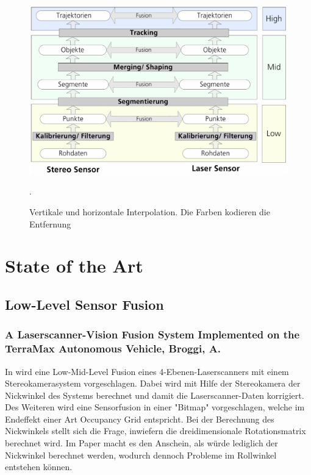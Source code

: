 \documentclass[10pt]{article}
\begin{document}
\begin{figure}[ht]\centering%
	\includegraphics[width=15cm]{images/png/haberjahn_sensorfusion.png}
	\caption[Badino Interpolation]{ Vertikale und horizontale Interpolation. Die Farben kodieren die Entfernung \cite{Badino2011a} }.
	\label{img:haberjahn_sensorfusion}
\end{figure}

\section*{State of the Art}


\subsection*{Low-Level Sensor Fusion}

\subsubsection*{A Laserscanner-Vision Fusion System Implemented on the TerraMax Autonomous Vehicle, Broggi, A. \cite{Broggi2006}}

In \cite{Broggi2006} wird eine Low-Mid-Level Fusion eines 4-Ebenen-Laserscanners mit einem Stereokamerasystem vorgeschlagen. Dabei wird mit Hilfe der Stereokamera der Nickwinkel des Systems berechnet und damit die Laserscanner-Daten korrigiert. Des Weiteren wird eine Sensorfusion in einer "Bitmap" vorgeschlagen, welche im Endeffekt einer Art Occupancy Grid entspricht.
Bei der Berechnung des Nickwinkels stellt sich die Frage, inwiefern die dreidimensionale Rotationsmatrix berechnet wird. Im Paper macht es den Anschein, als würde lediglich der Nickwinkel berechnet werden, wodurch dennoch Probleme im Rollwinkel entstehen können.
\end{document}
